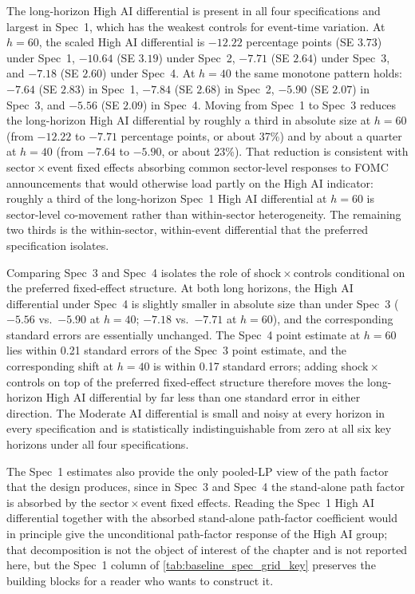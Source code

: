 

The long-horizon High AI differential is present in all four
specifications and largest in Spec~1, which has the weakest controls for
event-time variation. At $h = 60$, the scaled High AI differential is
$-12.22$ percentage points (SE $3.73$) under Spec~1, $-10.64$ (SE $3.19$)
under Spec~2, $-7.71$ (SE $2.64$) under Spec~3, and $-7.18$ (SE $2.60$)
under Spec~4. At $h = 40$ the same monotone pattern holds: $-7.64$
(SE $2.83$) in Spec~1, $-7.84$ (SE $2.68$) in Spec~2, $-5.90$ (SE $2.07$)
in Spec~3, and $-5.56$ (SE $2.09$) in Spec~4. Moving from Spec~1 to
Spec~3 reduces the long-horizon High AI differential by roughly a third
in absolute size at $h = 60$ (from $-12.22$ to $-7.71$ percentage points,
or about 37\%) and by about a quarter at $h = 40$ (from $-7.64$ to
$-5.90$, or about 23\%). That reduction is consistent with
sector\,$\times$\,event fixed effects absorbing common sector-level
responses to FOMC announcements that would otherwise load partly on the
High AI indicator: roughly a third of the long-horizon Spec~1 High AI
differential at $h = 60$ is sector-level co-movement rather than
within-sector heterogeneity. The remaining two thirds is the
within-sector, within-event differential that the preferred specification
isolates.

Comparing Spec~3 and Spec~4 isolates the role of shock\,$\times$\,controls
conditional on the preferred fixed-effect structure. At both long
horizons, the High AI differential under Spec~4 is slightly smaller in
absolute size than under Spec~3 ($-5.56$ vs.\ $-5.90$ at $h = 40$; $-7.18$
vs.\ $-7.71$ at $h = 60$), and the corresponding standard errors are
essentially unchanged. The Spec~4 point estimate at $h = 60$ lies within
0.21 standard errors of the Spec~3 point estimate, and the corresponding
shift at $h = 40$ is within 0.17 standard errors; adding
shock\,$\times$\,controls on top of the preferred fixed-effect structure
therefore moves the long-horizon High AI differential by far less than
one standard error in either direction. The Moderate AI differential is
small and noisy at every horizon in every specification and is
statistically indistinguishable from zero at all six key horizons under
all four specifications.

The Spec~1 estimates also provide the only pooled-LP view of the path
factor that the design produces, since in Spec~3 and Spec~4 the
stand-alone path factor is absorbed by the sector\,$\times$\,event fixed
effects. Reading the Spec~1 High AI differential together with the
absorbed stand-alone path-factor coefficient would in principle give the
unconditional path-factor response of the High AI group; that
decomposition is not the object of interest of the chapter and is not
reported here, but the Spec~1 column of
\cref{tab:baseline_spec_grid_key} preserves the building blocks for a
reader who wants to construct it.

